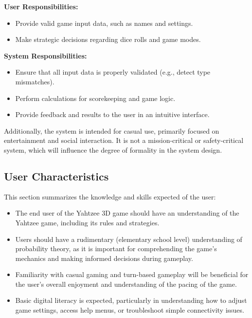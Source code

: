   \noindent\textbf{User Responsibilities:}
\begin{itemize}
    \item Provide valid game input data, such as names and settings.
    \item Make strategic decisions regarding dice rolls and game modes.
\end{itemize}

\noindent\textbf{System Responsibilities:}
\begin{itemize}
    \item Ensure that all input data is properly validated (e.g., detect type mismatches).
    \item Perform calculations for scorekeeping and game logic.
    \item Provide feedback and results to the user in an intuitive interface.
\end{itemize}

\noindent Additionally, the system is intended for casual use, primarily focused on entertainment and social interaction. It is not a mission-critical or safety-critical system, which will influence the degree of formality in the system design.

\subsection{User Characteristics} \label{SecUserCharacteristics}

This section summarizes the knowledge and skills expected of the user:
  
\begin{itemize}
    \item The end user of the Yahtzee 3D game should have an understanding of the Yahtzee game, including its rules and strategies.
    \item Users should have a rudimentary (elementary school level) understanding of probability theory, as it is important for comprehending the game's mechanics and making informed decisions during gameplay.
    \item Familiarity with casual gaming and turn-based gameplay will be beneficial for the user's overall enjoyment and understanding of the pacing of the game.
    \item Basic digital literacy is expected, particularly in understanding how to adjust game settings, access help menus, or troubleshoot simple connectivity issues.
\end{itemize}

